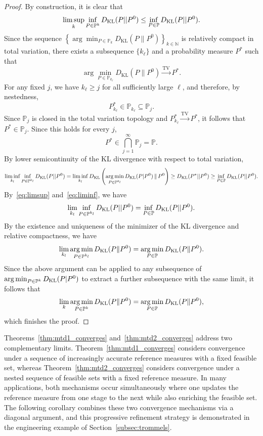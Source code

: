 \documentclass{article}
\newcounter{example}[section]
\newcommand{\p}{\mathbb{P}}
\DeclareMathOperator*{\argmin}{arg\,min}
\begin{document}
\begin{proof}
By construction, it is clear that
\begin{equation}\label{eq:limsup}
    \limsup_{k} \inf_{P \in \p^{k}} D_{\rm KL}(P || P^{0}) \le \inf_{P \in \p} D_{\rm KL}(P || P^{0}).
\end{equation}
Since the sequence
$\left\{
\arg\min_{P\in\p_k}
D_{\mathrm{KL}}(P\|P^0)
\right\}_{k\in\mathbb{N}}$
is relatively compact in total variation, there exists a subsequence $\{k_\ell\}$ and a probability measure $P^\ast$ such that
\[
\arg\min_{P\in\p_{k_\ell}}
D_{\mathrm{KL}}(P\|P^0)
\xrightarrow{\mathrm{TV}}
P^\ast.
\]
For any fixed $j$, we have $k_\ell\geq j$ for all sufficiently large
$\ell$, and therefore, by nestedness,
\[
P_{k_\ell}^\ast\in\p_{k_\ell}\subseteq\p_j.
\]
Since $\p_j$ is closed in the total variation topology and
$P_{k_\ell}^\ast\xrightarrow{\mathrm{TV}}P^\ast$, it follows that
$P^\ast\in\p_j$. Since this holds for every $j$,
\[
P^\ast\in\bigcap_{j=1}^{\infty}\p_j=\p.
\]
By lower semicontinuity of the KL divergence with respect to total variation,
\begin{equation}\label{eq:liminf}
    \liminf_{k_{l}} \inf_{P \in \p^{k_{l}}} D_{\rm KL}(P || P^{0}) = \liminf_{k_{l}}D_{\rm KL}\left(\argmin_{P \in \p^{k_{l}}}D_{\rm KL}(P | P^{0})\, \| \, P^{0}\right)  \ge  D_{\rm KL}(P^{*} || P^{0}) \ge \inf_{P \in \p} D_{\rm KL}(P || P^{0}).
\end{equation}
By~\eqref{eq:limsup} and~\eqref{eq:liminf}, we have
\begin{equation*}
    \lim_{k_{l}} \inf_{P \in \p^{k_{l}}} D_{\rm KL}(P || P^{0}) = \inf_{P \in \p} D_{\rm KL}(P || P^{0}).
\end{equation*}
By the existence and uniqueness of the minimizer of the KL divergence and relative compactness, we have
\begin{equation*}
    \lim_{k_{l}} \argmin_{P \in \p^{k_{l}}}D_{\rm KL}(P \| P^{0}) = \argmin_{P \in \p}D_{\rm KL}(P \| P^{0}).
\end{equation*}
Since the above argument can be applied to any subsequence of $\argmin_{P \in \p^{k}}D_{\rm KL}(P | P^{0})$ to extract a further subsequence with the same limit, it follows that
\begin{equation*}
    \lim_{k} \argmin_{P \in \p^{k}}D_{\rm KL}(P \| P^{0}) = \argmin_{P \in \p}D_{\rm KL}(P \| P^{0}),
\end{equation*}
which finishes the proof.
\end{proof}

Theorems~\ref{thm:mtd1_converges} and~\ref{thm:mtd2_converges} address two complementary limits.
Theorem~\ref{thm:mtd1_converges} considers convergence under a sequence of increasingly accurate reference measures with a fixed feasible set, whereas Theorem~\ref{thm:mtd2_converges} considers convergence under a nested sequence of feasible sets with a fixed reference measure.
In many applications, both mechanisms occur simultaneously where one updates the reference measure from one stage to the next while also enriching the feasible set.
The following corollary combines these two convergence mechanisms via a diagonal argument, and this progressive refinement strategy is demonstrated in the engineering example of Section~\ref{subsec:trommels}.
\end{document}
